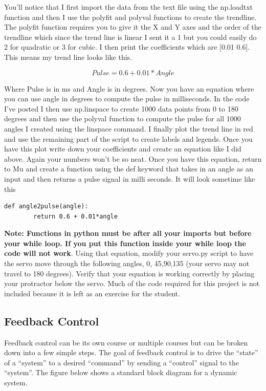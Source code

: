 You’ll notice that I first import the data from the text file using the np.loadtxt function and then I use the polyfit and polyval functions to create the trendline. The polyfit function requires you to give it the X and Y axes and the order of the trendline which since the trend line is linear I sent it a 1 but you could easily do 2 for quadratic or 3 for cubic. I then print the coefficients which are [0.01 0.6]. This means my trend line looks like this.

\begin{equation}
Pulse = 0.6 + 0.01*Angle
\end{equation}

Where Pulse is in ms and Angle is in degrees. Now you have an equation where you can use angle in degrees to compute the pulse in milliseconds. In the code I’ve posted I then use np.linspace to create 1000 data points from 0 to 180 degrees and then use the polyval function to compute the pulse for all 1000 angles I created using the linspace command. I finally plot the trend line in red and use the remaining part of the script to create labels and legends. Once you have this plot write down your coefficients and create an equation like I did above. Again your numbers won’t be so neat. Once you have this equation, return to Mu and create a function using the def keyword that takes in an angle as an input and then returns a pulse signal in milli seconds. It will look sometime like this

\begin{verbatim}
def angle2pulse(angle):
        return 0.6 + 0.01*angle
\end{verbatim}

{\bf Note: Functions in python must be after all your imports but before your while loop. If you put this function inside your while loop the code will not work}. Using that equation, modify your servo.py script to have the servo move through the following angles, 0, 45,90,135 (your servo may not travel to 180 degrees). Verify that your equation is working correctly by placing your protractor below the servo. Much of the code required for this project is not included because it is left as an exercise for the student.

\subsection{Feedback Control}

Feedback control can be its own course or multiple courses but can be
broken down into a few simple steps. The goal of feedback control is
to drive the “state” of a “system” to a desired “command” by sending a
“control” signal to the “system”. The figure below shows a standard block diagram for a dynamic system. 

